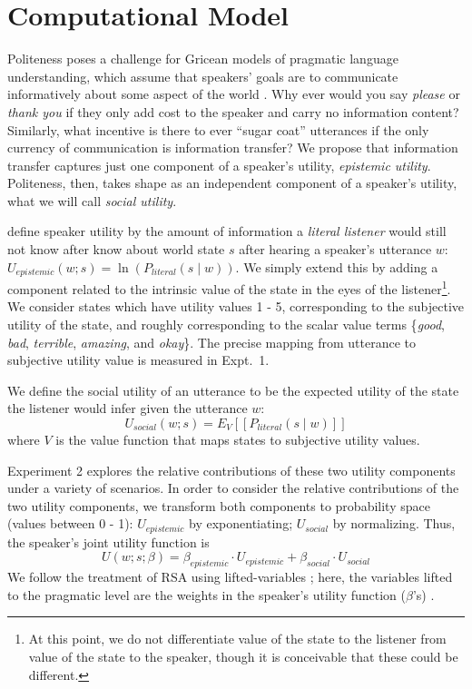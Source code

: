 \documentclass[10pt,letterpaper]{article}
\begin{document}
\section{Computational Model}

Politeness poses a challenge for Gricean models of pragmatic language understanding, which assume that speakers' goals are to communicate informatively about some aspect of the world \cite{Frank2012, Goodman2013}. 
Why ever would you say \emph{please} or \emph{thank you} if they only add cost to the speaker and carry no information content?
Similarly, what incentive is there to ever ``sugar coat'' utterances if the only currency of communication is information transfer? 
We propose that information transfer captures just one component of a speaker's utility, \emph{epistemic utility}.
Politeness, then, takes shape as an independent component of a speaker's utility, what we will call \emph{social utility}. 

 define speaker utility by the amount of information a \emph{literal listener} would still not know after know about world state $s$ after hearing a speaker's utterance $w$: 
$U_{epistemic}(w; s) = \ln(P_{literal}(s \mid w)) $.
We simply extend this by adding a component related to the intrinsic value of the state in the eyes of the listener\footnote{At this point, we do not differentiate value of the state to the listener from value of the state to the speaker, though it is conceivable that these could be different.}.
We consider states which have utility values 1 - 5, corresponding to the subjective utility of the state, and roughly corresponding to the scalar value terms \{\emph{good}, \emph{bad}, \emph{terrible}, \emph{amazing}, and \emph{okay}\}. 
The precise mapping from utterance to subjective utility value is measured in Expt.~1.

We define the social utility of an utterance to be the expected utility of the state the listener would infer given the utterance $w$: 
%
$$
U_{social}(w; s) = E_{V}[[P_{literal}(s \mid w)]]
$$
%
where $V$ is the value function that maps states to subjective utility values. 

Experiment 2 explores the relative contributions of these two utility components under a variety of scenarios. 
In order to consider the relative contributions of the two utility components, we transform both components to probability space (values between 0 - 1): $U_{epistemic}$ by exponentiating; $U_{social}$ by normalizing. Thus, the speaker's joint utility function is
%
$$
U(w;s; \beta) = \beta_{epistemic}\cdot U_{epistemic} + \beta_{social} \cdot U_{social}
$$
%
We follow the treatment of RSA using lifted-variables \cite{GoodmanLassiter2015, Kao2014, Degen2015}; here, the variables lifted to the pragmatic level are the weights in the speaker's utility function ($\beta$'s) .
\end{document}
